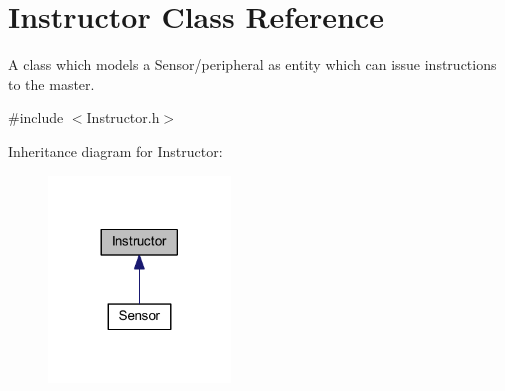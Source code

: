 \hypertarget{class_instructor}{}\section{Instructor Class Reference}
\label{class_instructor}


A class which models a Sensor/peripheral as entity which can issue instructions to the master.  




{\ttfamily \#include $<$Instructor.\+h$>$}



Inheritance diagram for Instructor\+:
\nopagebreak
\begin{figure}[H]
\begin{center}
\leavevmode
\includegraphics[width=137pt]{class_instructor__inherit__graph}
\end{center}
\end{figure}
